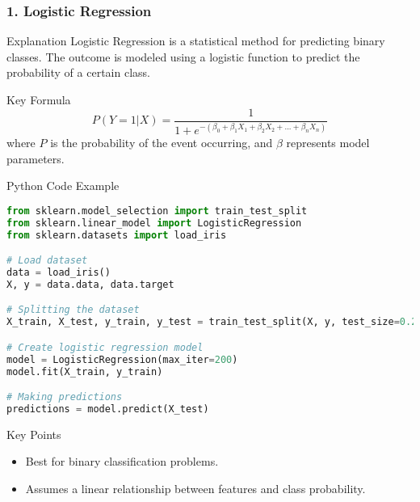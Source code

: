 \documentclass[aspectratio=169]{beamer}
\begin{document}
\begin{frame}[fragile]
    \frametitle{1. Logistic Regression}
    \begin{block}{Explanation}
        Logistic Regression is a statistical method for predicting binary classes. The outcome is modeled using a logistic function to predict the probability of a certain class.
    \end{block}
    \begin{block}{Key Formula}
        \begin{equation}
            P(Y=1|X) = \frac{1}{1 + e^{-(\beta_0 + \beta_1X_1 + \beta_2X_2 + ... + \beta_nX_n)}}
        \end{equation}
        where \( P \) is the probability of the event occurring, and \( \beta \) represents model parameters.
    \end{block}

    \begin{block}{Python Code Example}
        \begin{lstlisting}[language=Python]
from sklearn.model_selection import train_test_split
from sklearn.linear_model import LogisticRegression
from sklearn.datasets import load_iris

# Load dataset
data = load_iris()
X, y = data.data, data.target

# Splitting the dataset
X_train, X_test, y_train, y_test = train_test_split(X, y, test_size=0.2, random_state=42)

# Create logistic regression model
model = LogisticRegression(max_iter=200)
model.fit(X_train, y_train)

# Making predictions
predictions = model.predict(X_test)
        \end{lstlisting}
    \end{block}
    \begin{block}{Key Points}
        \begin{itemize}
            \item Best for binary classification problems.
            \item Assumes a linear relationship between features and class probability.
        \end{itemize}
    \end{block}
\end{frame}
\end{document}
